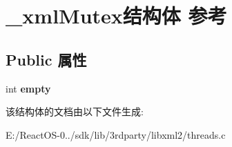 \hypertarget{struct__xml_mutex}{}\section{\+\_\+xml\+Mutex结构体 参考}
\label{struct__xml_mutex}
\subsection*{Public 属性}
\begin{DoxyCompactItemize}
\item 
\mbox{\label{struct__xml_mutex_a1a3703230e83d191cc55ae3c7dd108a9}} 
int {\bfseries empty}
\end{DoxyCompactItemize}


该结构体的文档由以下文件生成\+:\begin{DoxyCompactItemize}
\item 
E\+:/\+React\+O\+S-\/0../sdk/lib/3rdparty/libxml2/threads.\+c\end{DoxyCompactItemize}
